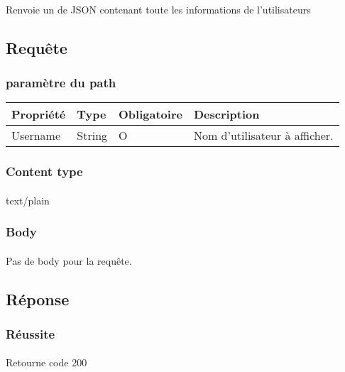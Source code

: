 \paragraph{}
	Renvoie un de JSON contenant toute les informations de l'utilisateurs

\subsection{Requête}
	\subsubsection{paramètre du path}
		\begin{center}
			\begin{tabularx}{\textwidth}{| T{0.2122\textwidth} | S{0.22\textwidth} | S{0.15\textwidth} | S{0.3\textwidth} |}
				\hline
				Propriété & Type & Obligatoire & Description \\
				\hline
				Username & String & O & Nom d'utilisateur à afficher. \\
				\hline
			\end{tabularx}
		\end{center}
		
	\subsubsection{Content type}
		\paragraph{}
			text/plain
			
	\subsubsection{Body}
		\paragraph{}
			Pas de body pour la requête.

\newpage
\subsection{Réponse}
	\subsubsection{Réussite}
		\paragraph{}
			Retourne code 200
			

